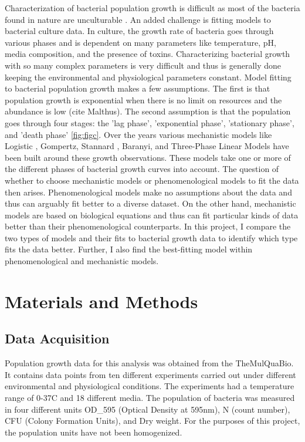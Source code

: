 \documentclass[11pt]{article}
\begin{document}
Characterization of bacterial population growth is difficult as most of the bacteria found in nature are unculturable \cite{doi:10.1128/JB.00345-12}. An added challenge is fitting models to bacterial culture data. In culture, the growth rate of bacteria goes through various phases \cite{monod1949growth} and is dependent on many parameters like temperature, pH, media composition, and the presence of toxins. Characterizing bacterial growth with so many complex parameters is very difficult and thus is generally done keeping the environmental and physiological parameters constant. Model fitting to bacterial population growth makes a few assumptions. The first is that population growth is exponential when there is no limit on resources and the abundance is low (cite Malthus). The second assumption is that the population goes through four stages: the 'lag phase', 'exponential phase', 'stationary phase', and 'death phase' \cite{doi:10.1080/10408398.2011.570463} \ref{fig:figc}. Over the years various mechanistic models like Logistic \cite{jason1983deterministic}, Gompertz, Stannard \cite{Zwietering1990-lp}, Baranyi, and Three-Phase Linear Models \cite{BUCHANAN1997313} have been built around these growth observations. These models take one or more of the different phases of bacterial growth curves into account. The question of whether to choose mechanistic models or phenomenological models to fit the data then arises. Phenomenological models make no assumptions about the data and thus can arguably fit better to a diverse dataset. On the other hand, mechanistic models are based on biological equations and thus can fit particular kinds of data better than their phenomenological counterparts. In this project, I compare the two types of models and their fits to bacterial growth data to identify which type fits the data better. Further, I also find the best-fitting model within phenomenological and mechanistic models. 

\section{Materials and Methods}

\subsection{Data Acquisition}

Population growth data for this analysis was obtained from the TheMulQuaBio. It contains data points from ten different experiments carried out under different environmental and physiological conditions. The experiments had a temperature range of 0-37\textdegree C and 18 different media. The population of bacteria was measured in four different units OD\_595 (Optical Density at 595nm), N (count number), CFU (Colony Formation Units), and Dry weight. For the purposes of this project, the population units have not been homogenized.  
\end{document}
